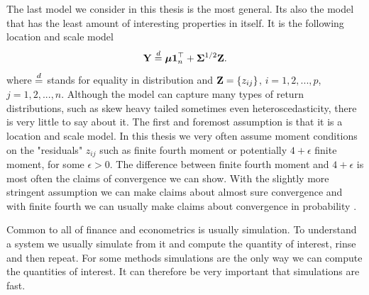 \documentclass[]{book}\usepackage{knitr}
\begin{document}
% 
The last model we consider in this thesis is the most general.
Its also the model that has the least amount of interesting properties in itself.
It is the following location and scale model
\begin{equation}\label{eqn:location_scale_model}
\mathbf{Y} \stackrel{d}{=} \mbox{\boldmath$\mu$} \mathbf{1}^\top_n + \mathbf{\Sigma}^{1/2} \mathbf{Z}.
\end{equation}
where $\stackrel{d}{=}$ stands for equality in distribution and $\mathbf{Z} = \{z_{ij}\}$, $i=1,2,...,p$, $j=1,2,...,n$.
Although the model can capture many types of return distributions, such as skew heavy tailed sometimes even heteroscedasticity, there is very little to say about it.
The first and foremost assumption is that it is a location and scale model.
In this thesis we very often assume moment conditions on the "residuals" $z_{ij}$ such as finite fourth moment or potentially $4+\epsilon$ finite moment, for some $\epsilon>0$.
The difference between finite fourth moment and $4+\epsilon$ is most often the claims of convergence we can show.
With the slightly more stringent assumption we can make claims about almost sure convergence and with finite fourth we can usually make claims about convergence in probability \citet{REF}.

Common to all of finance and econometrics is usually simulation. 
To understand a system we usually simulate from it and compute the quantity of interest, rinse and then repeat.
For some methods simulations are the only way we can compute the quantities of interest.
It can therefore be very important that simulations are fast.
\end{document}
